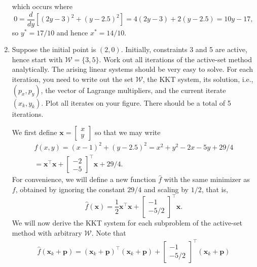 \documentclass{../kin_math}
\begin{document}
\begin{questions}
\begin{enumerate}
\begin{solution}
      which occurs where
      \begin{equation*}
        0 = \frac{d}{dy} \left[(2y - 3)^2 + (y - 2.5)^2\right] = 4(2y - 3) + 2(y - 2.5) = 10y - 17,
      \end{equation*}
      so $y^* = 17 / 10$ and hence $x^* = 14 / 10$.
    \end{solution}
    \item Suppose the initial point is $(2, 0)$. Initially, constraints 3 and 5 are active, hence start with $\mathcal{W} = \{3, 5\}$. Work out all iterations of the active-set method analytically. The arising linear systems should be very easy to solve. For each iteration, you need to write out the set $\mathcal{W}$, the KKT system, its solution, i.e., $(p_x, p_y)$, the vector of Lagrange multipliers, and the current iterate $(x_k, y_k)$. Plot all iterates on your figure. There should be a total of 5 iterations.
    \newpage
    \begin{solution}
      We first define $\textbf{x} = \begin{bmatrix} x \\ y \end{bmatrix}$ so that we may write
      \begin{multline*}
        f(x, y) = (x - 1)^2 + (y - 2.5)^2 = x^2 + y^2 - 2x - 5y + 29 / 4 \\
        = \textbf{x}^\top \textbf{x} + \begin{bmatrix} -2 \\ -5 \end{bmatrix}^\top \textbf{x} + 29 / 4.
      \end{multline*}
      For convenience, we will define a new function $\hat{f}$ with the same minimizer as $f$, obtained by ignoring the constant $29 / 4$ and scaling by $1 / 2$, that is,
      \begin{equation*}
        \hat{f}(\textbf{x}) = \frac{1}{2} \textbf{x}^\top \textbf{x} + \begin{bmatrix} -1 \\ -5 / 2 \end{bmatrix}^\top \textbf{x}.
      \end{equation*}
      We will now derive the KKT system for each subproblem of the active-set method with arbitrary $\mathcal{W}$. Note that
      \begin{multline*}
        \hat{f}(\textbf{x}_k + \textbf{p}) = (\textbf{x}_k + \textbf{p})^\top (\textbf{x}_k + \textbf{p}) + \begin{bmatrix} -1 \\ -5 / 2 \end{bmatrix}^\top (\textbf{x}_k + \textbf{p}) \\

\end{multline*}
\end{solution}
\end{enumerate}
\end{questions}
\end{document}
